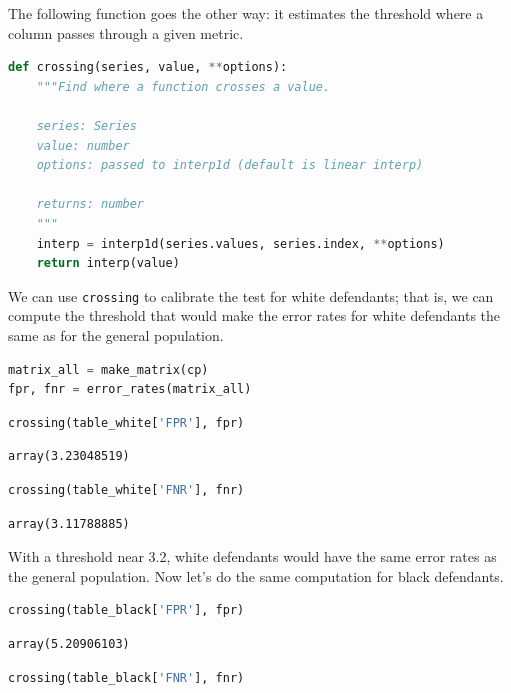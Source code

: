 The following function goes the other way: it estimates the threshold
where a column passes through a given metric.

\begin{lstlisting}[language=Python]
def crossing(series, value, **options):
    """Find where a function crosses a value.
    
    series: Series
    value: number
    options: passed to interp1d (default is linear interp)
    
    returns: number
    """
    interp = interp1d(series.values, series.index, **options)
    return interp(value)
\end{lstlisting}

We can use \passthrough{\lstinline!crossing!} to calibrate the test for
white defendants; that is, we can compute the threshold that would make
the error rates for white defendants the same as for the general
population.

\begin{lstlisting}[language=Python]
matrix_all = make_matrix(cp)
fpr, fnr = error_rates(matrix_all)
\end{lstlisting}

\begin{lstlisting}[language=Python]
crossing(table_white['FPR'], fpr)
\end{lstlisting}

\begin{lstlisting}[]
array(3.23048519)
\end{lstlisting}

\begin{lstlisting}[language=Python]
crossing(table_white['FNR'], fnr)
\end{lstlisting}

\begin{lstlisting}[]
array(3.11788885)
\end{lstlisting}

With a threshold near 3.2, white defendants would have the same error
rates as the general population. Now let's do the same computation for
black defendants.

\begin{lstlisting}[language=Python]
crossing(table_black['FPR'], fpr)
\end{lstlisting}

\begin{lstlisting}[]
array(5.20906103)
\end{lstlisting}

\begin{lstlisting}[language=Python]
crossing(table_black['FNR'], fnr)
\end{lstlisting}

